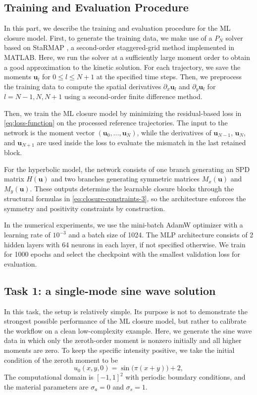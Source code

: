 \documentclass[11pt]{article}
\numberwithin{equation}{section}
\newcommand{\vect}[1]{\boldsymbol{#1}}
\begin{document}
\subsection{Training and Evaluation Procedure}

In this part, we describe the training and evaluation procedure for the ML closure model. First, to generate the training data, we make use of a $P_N$ solver based on StaRMAP \cite{seibold2014starmap}, a second-order staggered-grid method implemented in MATLAB. Here, we run the solver at a sufficiently large moment order to obtain a good approximation to the kinetic solution. For each trajectory, we save the moments $\vect{u}_l$ for $0\le l\le {N+1}$ at the specified time steps.
Then, we preprocess the training data to compute the spatial derivatives $\partial_x \vect{u}_l$ and $\partial_y \vect{u}_l$ for $l = N-1, N, N+1$ using a second-order finite difference method.

Then, we train the ML closure model by minimizing the residual-based loss in \eqref{eq:loss-function} on the processed reference trajectories. The input to the network is the moment vector $(\vect{u}_0,\dots,\vect{u}_N)$, while the derivatives of $\vect{u}_{N-1}$, $\vect{u}_N$, and $\vect{u}_{N+1}$ are used inside the loss to evaluate the mismatch in the last retained block.

For the hyperbolic model, the network consists of one branch generating an SPD matrix $H(\vect{u})$ and two branches generating symmetric matrices $M_x(\vect{u})$ and $M_y(\vect{u})$. These outputs determine the learnable closure blocks through the structural formulas in \eqref{eq:closure-constraints-3}, so the architecture enforces the symmetry and positivity constraints by construction.


In the numerical experiments, we use the mini-batch AdamW optimizer with a learning rate of $10^{-3}$ and a batch size of 1024. The MLP architecture consists of 2 hidden layers with 64 neurons in each layer, if not specified otherwise. We train for 1000 epochs and select the checkpoint with the smallest validation loss for evaluation.

\subsection{Task 1: a single-mode sine wave solution}

In this task, the setup is relatively simple. Its purpose is not to demonstrate the strongest possible performance of the ML closure model, but rather to calibrate the workflow on a clean low-complexity example. Here, we generate the sine wave data in which only the zeroth-order moment is nonzero initially and all higher moments are zero. To keep the specific intensity positive, we take the initial condition of the zeroth moment to be
\begin{equation}\label{eq:single-mode-sine-initial-condition}
    u_0(x,y,0) = \sin\bigl(\pi(x + y)\bigr) + 2,
\end{equation}
The computational domain is $[-1, 1]^2$ with periodic boundary conditions, and the material parameters are $\sigma_a=0$ and $\sigma_{s}=1$.
\end{document}
